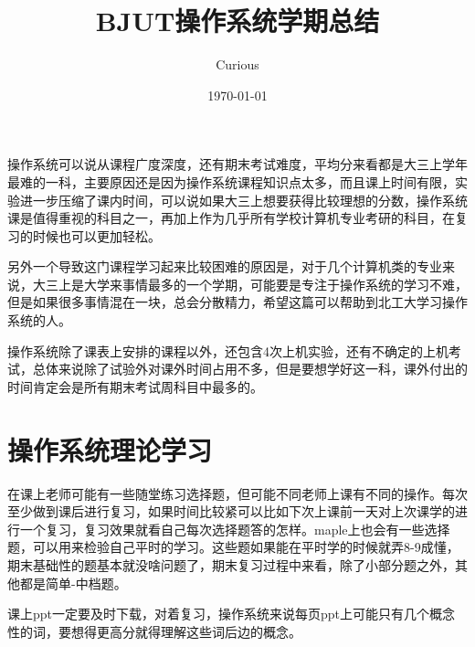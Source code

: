 \documentclass[UTF8]{ctexart}  %
\begin{document}


\title{BJUT操作系统学期总结}  %
\author{Curious}  %
\date{\today}    %
\maketitle     %

\large{操作系统可以说从课程广度深度，还有期末考试难度，平均分来看都是大三上学年最难的一科，主要原因还是因为操作系统课程知识点太多，而且课上时间有限，实验进一步压缩了课内时间，可以说如果大三上想要获得比较理想的分数，操作系统课是值得重视的科目之一，再加上作为几乎所有学校计算机专业考研的科目，在复习的时候也可以更加轻松。

另外一个导致这门课程学习起来比较困难的原因是，对于几个计算机类的专业来说，大三上是大学来事情最多的一个学期，可能要是专注于操作系统的学习不难，但是如果很多事情混在一块，总会分散精力，希望这篇可以帮助到北工大学习操作系统的人。

操作系统除了课表上安排的课程以外，还包含4次上机实验，还有不确定的上机考试，总体来说除了试验外对课外时间占用不多，但是要想学好这一科，课外付出的时间肯定会是所有期末考试周科目中最多的。
}
\tableofcontents  %

\newpage
\section{操作系统理论学习}%
\large{在课上老师可能有一些随堂练习选择题，但可能不同老师上课有不同的操作。每次至少做到课后进行复习，如果时间比较紧可以比如下次上课前一天对上次课学的进行一个复习，复习效果就看自己每次选择题答的怎样。maple上也会有一些选择题，可以用来检验自己平时的学习。这些题如果能在平时学的时候就弄8-9成懂，期末基础性的题基本就没啥问题了，期末复习过程中来看，除了小部分题之外，其他都是简单-中档题。

课上ppt一定要及时下载，对着复习，操作系统来说每页ppt上可能只有几个概念性的词，要想得更高分就得理解这些词后边的概念。}

\newpage
\end{document}
